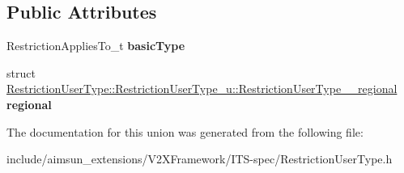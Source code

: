 \subsection*{Public Attributes}
\begin{DoxyCompactItemize}
\item 
Restriction\+Applies\+To\+\_\+t {\bfseries basic\+Type}\hypertarget{unionRestrictionUserType_1_1RestrictionUserType__u_a82734361d3d60210b9441cb47f9a1895}{}\label{unionRestrictionUserType_1_1RestrictionUserType__u_a82734361d3d60210b9441cb47f9a1895}

\item 
struct \hyperlink{structRestrictionUserType_1_1RestrictionUserType__u_1_1RestrictionUserType____regional}{Restriction\+User\+Type\+::\+Restriction\+User\+Type\+\_\+u\+::\+Restriction\+User\+Type\+\_\+\+\_\+regional} {\bfseries regional}\hypertarget{unionRestrictionUserType_1_1RestrictionUserType__u_a79caca67ca5f080f358054dac59b277e}{}\label{unionRestrictionUserType_1_1RestrictionUserType__u_a79caca67ca5f080f358054dac59b277e}

\end{DoxyCompactItemize}


The documentation for this union was generated from the following file\+:\begin{DoxyCompactItemize}
\item 
include/aimsun\+\_\+extensions/\+V2\+X\+Framework/\+I\+T\+S-\/spec/Restriction\+User\+Type.\+h\end{DoxyCompactItemize}
